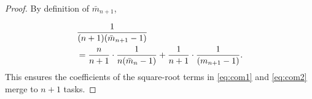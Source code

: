 \documentclass[letterpaper]{article} %
\begin{document}
\begin{proof}
By definition of $\bar{m}_{n+1}$, 

\begin{equation}
    \begin{aligned}
            &\frac{1}{(n+1)(\bar{m}_{n+1} - 1)}  \\
            &= \frac{n}{n+1} \cdot \frac{1}{n(\bar{m}_n - 1)} + \frac{1}{n+1} \cdot \frac{1}{(m_{n+1} - 1)}.
    \end{aligned} \notag
\end{equation}
This ensures the coefficients of the square-root terms in \ref{eq:com1} and \ref{eq:com2} merge to  $n+1$ tasks.

 








\end{proof}
\end{document}
